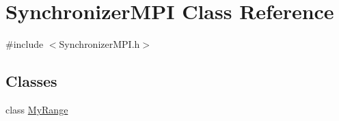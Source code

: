 \hypertarget{class_synchronizer_m_p_i}{}\section{Synchronizer\+M\+P\+I Class Reference}
\label{class_synchronizer_m_p_i}


{\ttfamily \#include $<$Synchronizer\+M\+P\+I.\+h$>$}

\subsection*{Classes}
\begin{DoxyCompactItemize}
\item 
class \hyperlink{class_synchronizer_m_p_i_1_1_my_range}{My\+Range}
\end{DoxyCompactItemize}
